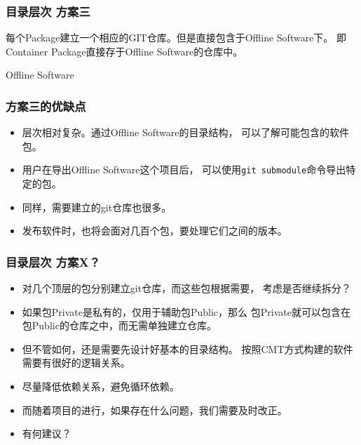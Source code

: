 \begin{frame}
    \frametitle{目录层次 方案三}
    每个Package建立一个相应的GIT仓库。但是直接包含于Offline Software下。
    即Container Package直接存于Offline Software的仓库中。
    \renewcommand*\DTstylecomment{\rmfamily\color{red}\textsc}
    \begin{block}{Offline Software}
    \end{block}
\end{frame}

\begin{frame}
    \frametitle{方案三的优缺点}
    \begin{itemize}
        \item 层次相对复杂。通过Offline Software的目录结构，
              可以了解可能包含的软件包。
        \item 用户在导出Offline Software这个项目后，
              可以使用{\tt git submodule}命令导出特定的包。
        \item 同样，需要建立的git仓库也很多。
        \item 发布软件时，也将会面对几百个包，要处理它们之间的版本。
    \end{itemize}
\end{frame}

\begin{frame}
    \frametitle{目录层次 方案X？}
    \begin{itemize}
        \item 对几个顶层的包分别建立git仓库，而这些包根据需要，
              考虑是否继续拆分？
        \item 如果包Private是私有的，仅用于辅助包Public，那么
              包Private就可以包含在包Public的仓库之中，而无需单独建立仓库。
        \item 但不管如何，还是需要先设计好基本的目录结构。
              按照CMT方式构建的软件需要有很好的逻辑关系。
        \item 尽量降低依赖关系，避免循环依赖。
        \item 而随着项目的进行，如果存在什么问题，我们需要及时改正。
        \item 有何建议？
    \end{itemize}
\end{frame}
